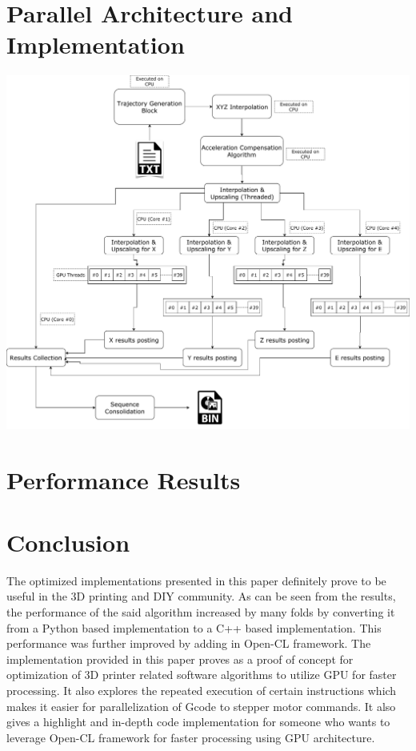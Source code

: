 \documentclass[12pt,letterpaper]{article}
\begin{document}
\section{Parallel Architecture and Implementation}

\begin{center}
   \includegraphics[scale=0.40]{images/parallel-program.pdf}
   \label{fig:parallel_algorithm}
\end{center}

\section{Performance Results}

\section{Conclusion}
The optimized implementations presented in this paper definitely prove to be useful in the 3D printing and DIY community. As can be seen from the results, the performance of the said algorithm increased by many folds by converting it from a Python based implementation to a C++ based implementation. This performance was further improved by adding in Open-CL framework. The implementation provided in this paper proves as a proof of concept for optimization of 3D printer related software algorithms to utilize GPU for faster processing. It also explores the repeated execution of certain instructions which makes it easier for parallelization of Gcode to stepper motor commands.
It also gives a highlight and in-depth code implementation for someone who wants to leverage Open-CL framework for faster processing using GPU architecture.
\end{document}
